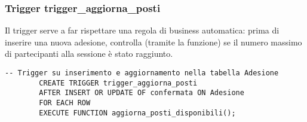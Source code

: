 \documentclass[a4paper, 12pt]{article}
\begin{document}
    \subsubsection{Trigger trigger\_aggiorna\_posti}
        Il trigger serve a far rispettare una regola di business automatica:
        prima di inserire una nuova adesione, controlla (tramite la funzione) se il numero massimo di partecipanti alla sessione è stato raggiunto.
        \begin{lstlisting}[style=sqlstyle]
        -- Trigger su inserimento e aggiornamento nella tabella Adesione
        CREATE TRIGGER trigger_aggiorna_posti
        AFTER INSERT OR UPDATE OF confermata ON Adesione
        FOR EACH ROW
        EXECUTE FUNCTION aggiorna_posti_disponibili();
        \end{lstlisting}
\end{document}
